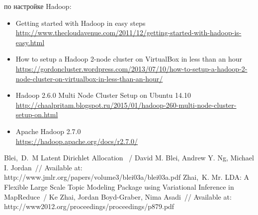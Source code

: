  по настройке Hadoop:\vspace*{-0.5em}
\begin{itemize}\itemsep-5pt
    \item Getting started with Hadoop in easy steps\\\footnotesize
        \url{http://www.thecloudavenue.com/2011/12/getting-started-with-hadoop-is-easy.html}
        \normalsize
    \item How to setup a Hadoop 2-node cluster on VirtualBox in less than an hour\\\footnotesize
        \url{https://gordoncluster.wordpress.com/2013/07/10/how-to-setup-a-hadoop-2-
        node-cluster-on-virtualbox-in-less-than-an-hour/}
        \normalsize
    \item Hadoop 2.6.0 Multi Node Cluster Setup on Ubuntu 14.10\\\footnotesize
        \url{http://chaalpritam.blogspot.ru/2015/01/hadoop-260-multi-node-cluster-setup-on.html}
        \normalsize
    \item Apache Hadoop 2.7.0\\\footnotesize
        \url{https://hadoop.apache.org/docs/r2.7.0/}
        \normalsize
\end{itemize}

\newpage

\renewcommand{\refname}{Список используемой литературы}
\begin{thebibliography}{10}
     Blei,~D.~M Latent Dirichlet Allocation ~/ David M. Blei, Andrew Y. Ng, 
        Michael I. Jordan~// Available at: http://www.jmlr.org/papers/volume3/blei03a/blei03a.pdf
     Zhai,~K. Mr. LDA: A Flexible Large Scale Topic Modeling Package using Variational 
        Inference in MapReduce~/ Ke Zhai, Jordan Boyd-Graber, Nima Asadi~//
        Available at: http://www2012.org/proceedings/proceedings/p879.pdf
\end{thebibliography}